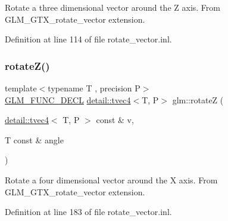 Rotate a three dimensional vector around the Z axis. From G\+L\+M\+\_\+\+G\+T\+X\+\_\+rotate\+\_\+vector extension. 

Definition at line 114 of file rotate\+\_\+vector.\+inl.

\mbox{\label{group__gtx__rotate__vector_ga1db5137be16ed5d375038e06707ac52b}} 
\subsubsection{\texorpdfstring{rotate\+Z()}{rotateZ()}\hspace{0.1cm}{\footnotesize\ttfamily [2/2]}}
{\footnotesize\ttfamily template$<$typename T , precision P$>$ \\
\hyperlink{setup_8hpp_ab2d052de21a70539923e9bcbf6e83a51}{G\+L\+M\+\_\+\+F\+U\+N\+C\+\_\+\+D\+E\+CL} \hyperlink{structglm_1_1detail_1_1tvec4}{detail\+::tvec4}$<$T, P$>$ glm\+::rotateZ (\begin{DoxyParamCaption}\item[{\hyperlink{structglm_1_1detail_1_1tvec4}{detail\+::tvec4}$<$ T, P $>$ const \&}]{v,  }\item[{T const \&}]{angle }\end{DoxyParamCaption})}

Rotate a four dimensional vector around the X axis. From G\+L\+M\+\_\+\+G\+T\+X\+\_\+rotate\+\_\+vector extension. 

Definition at line 183 of file rotate\+\_\+vector.\+inl.

